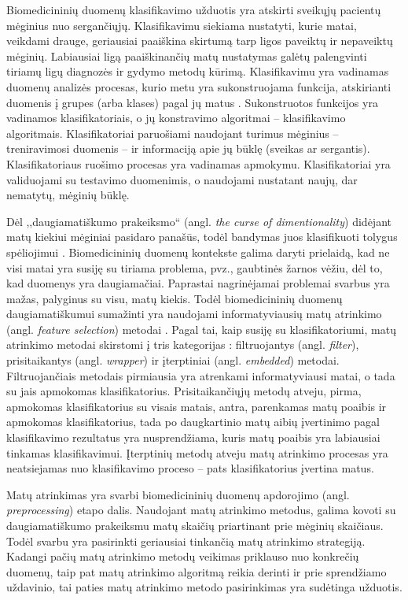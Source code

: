 Biomedicininių duomenų klasifikavimo užduotis yra atskirti sveikųjų pacientų mėginius nuo sergančiųjų. Klasifikavimu siekiama nustatyti, kurie matai, veikdami drauge, geriausiai paaiškina skirtumą tarp ligos paveiktų ir nepaveiktų mėginių. Labiausiai ligą paaiškinančių matų nustatymas galėtų palengvinti tiriamų ligų diagnozės ir gydymo metodų kūrimą. Klasifikavimu yra vadinamas duomenų analizės procesas, kurio metu yra sukonstruojama funkcija, atskirianti duomenis į grupes (arba klases) pagal jų matus \cite{fisher1936use}. Sukonstruotos funkcijos yra vadinamos klasifikatoriais, o jų konstravimo algoritmai -- klasifikavimo algoritmais. Klasifikatoriai paruošiami naudojant turimus mėginius -- treniravimosi duomenis -- ir informaciją apie jų būklę (sveikas ar sergantis). Klasifikatoriaus ruošimo procesas yra vadinamas apmokymu. Klasifikatoriai yra validuojami su testavimo duomenimis, o naudojami nustatant naujų, dar nematytų, mėginių būklę.

Dėl ,,daugiamatiškumo prakeiksmo`` (angl. \textit{the curse of dimentionality}) didėjant matų kiekiui mėginiai pasidaro panašūs, todėl bandymas juos klasifikuoti tolygus spėliojimui \cite{bellman1966adaptive}. Biomedicininių duomenų kontekste galima daryti prielaidą, kad ne visi matai yra susiję su tiriama problema, pvz., gaubtinės žarnos vėžiu, dėl to, kad duomenys yra daugiamačiai. Paprastai nagrinėjamai problemai svarbus yra mažas, palyginus su visu, matų kiekis.  Todėl biomedicininių duomenų daugiamatiškumui sumažinti yra naudojami informatyviausių matų atrinkimo (angl. \textit{feature selection}) metodai \cite{guyon2003introduction}. Pagal tai, kaip susiję su klasifikatoriumi, matų atrinkimo metodai skirstomi į tris kategorijas \cite{saeys2008robust}: filtruojantys (angl. \textit{filter}), prisitaikantys (angl. \textit{wrapper}) ir įterptiniai (angl. \textit{embedded}) metodai. Filtruojančiais metodais pirmiausia yra atrenkami informatyviausi matai, o tada su jais apmokomas klasifikatorius. 
Prisitaikančiųjų metodų atveju, pirma, apmokomas klasifikatorius su visais matais, antra, parenkamas matų poaibis ir apmokomas klasifikatorius, tada po daugkartinio matų aibių įvertinimo pagal klasifikavimo rezultatus yra nusprendžiama, kuris matų poaibis yra labiausiai tinkamas klasifikavimui. Įterptinių metodų atveju matų atrinkimo procesas yra neatsiejamas nuo klasifikavimo proceso -- pats klasifikatorius įvertina matus.

Matų atrinkimas yra svarbi biomedicininių duomenų apdorojimo (angl. \textit{preprocessing}) etapo dalis. Naudojant matų atrinkimo metodus, galima kovoti su daugiamatiškumo prakeiksmu matų skaičių priartinant prie mėginių skaičiaus. Todėl svarbu yra pasirinkti geriausiai tinkančią matų atrinkimo strategiją. Kadangi pačių matų atrinkimo metodų veikimas priklauso nuo konkrečių duomenų, taip pat matų atrinkimo algoritmą reikia derinti ir prie sprendžiamo uždavinio, tai paties matų atrinkimo metodo pasirinkimas yra sudėtinga užduotis. 

